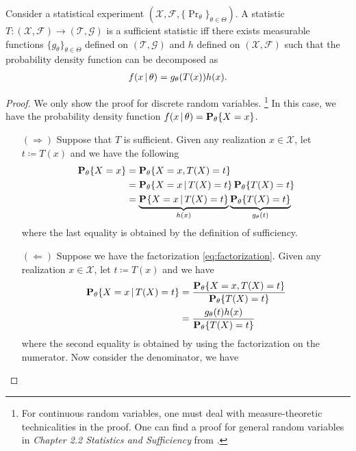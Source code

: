 \documentclass[a4paper]{article}
\begin{document}
\begin{theorem}\label{thm:fisher-neyman-factorization}
	Consider a statistical experiment $(\mathcal{X},\mathcal{F},\{\Pr_{\theta}\}_{\theta\in\Theta})$.
	A statistic $T:(\mathcal{X},\mathcal{F})\to(\mathcal{T},\mathcal{G})$ is a sufficient statistic iff
	there exists measurable functions $\{g_{\theta}\}_{\theta\in\Theta}$ defined on $(\mathcal{T},\mathcal{G})$ and
	$h$ defined on $(\mathcal{X},\mathcal{F})$ such that the probability density function can be decomposed as
	\begin{align}\label{eq:factorization}
		f(x\given\theta) = g_{\theta}(T(x)) h(x).
	\end{align}
\end{theorem}
\begin{proof}
	We only show the proof for discrete random variables.
	\footnote{
		For continuous random variables,
		one must deal with measure-theoretic technicalities in the proof.
		One can find a proof for general random variables in
		\emph{Chapter 2.2 Statistics and Sufficiency} from
		\cite{shao-1999}.
	}
	In this case, we have the probability density function $f(x\given\theta)=\pr[\theta]{X=x}$.
	\begin{itemize}
		\item[$(\Rightarrow)$]
			Suppose that $T$ is sufficient.
			Given any realization $x\in\mathcal{X}$,
			let $t\coloneqq T(x)$ and we have the following
			\begin{align*}
				\pr[\theta]{X=x}
				&= \pr[\theta]{X=x,T(X)=t} \\
				&= \pr[\theta]{X=x\given T(X)=t} \pr[\theta]{T(X)=t} \\
				&= \underbrace{\pr{X=x\given T(X)=t}}_{h(x)} \underbrace{\pr[\theta]{T(X)=t}}_{g_{\theta}(t)}
			\end{align*}
			where the last equality is obtained by the definition of sufficiency.
		\item[$(\Leftarrow)$]
			Suppose we have the factorization \eqref{eq:factorization}.
			Given any realization $x\in\mathcal{X}$,
			let $t\coloneqq T(x)$ and we have
			\begin{align*}
				\pr[\theta]{X=x\given T(X)=t}
				&= \frac{ \pr[\theta]{X=x,T(X)=t} }{ \pr[\theta]{T(X)=t} } \\
				&= \frac{ g_{\theta}(t) h(x) }{ \pr[\theta]{T(X)=t} }
			\end{align*}
			where the second equality is obtained by using the factorization on the numerator.
			Now consider the denominator, we have

\end{itemize}
\end{proof}
\end{document}
